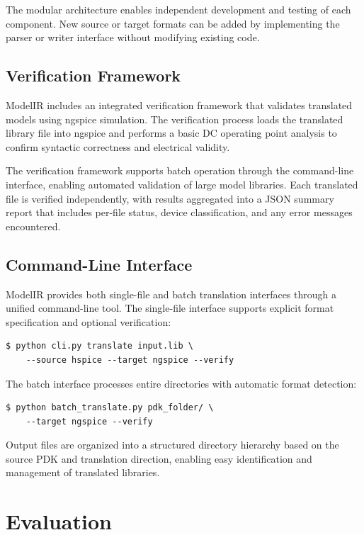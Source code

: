 \documentclass[conference]{IEEEtran}
\begin{document}
The modular architecture enables independent development and testing of each component. New source or target formats can be added by implementing the parser or writer interface without modifying existing code.

\subsection{Verification Framework}

ModelIR includes an integrated verification framework that validates translated models using ngspice simulation. The verification process loads the translated library file into ngspice and performs a basic DC operating point analysis to confirm syntactic correctness and electrical validity.

The verification framework supports batch operation through the command-line interface, enabling automated validation of large model libraries. Each translated file is verified independently, with results aggregated into a JSON summary report that includes per-file status, device classification, and any error messages encountered.

\subsection{Command-Line Interface}

ModelIR provides both single-file and batch translation interfaces through a unified command-line tool. The single-file interface supports explicit format specification and optional verification:

\begin{verbatim}
$ python cli.py translate input.lib \
    --source hspice --target ngspice --verify
\end{verbatim}

The batch interface processes entire directories with automatic format detection:

\begin{verbatim}
$ python batch_translate.py pdk_folder/ \
    --target ngspice --verify
\end{verbatim}

Output files are organized into a structured directory hierarchy based on the source PDK and translation direction, enabling easy identification and management of translated libraries.

\section{Evaluation}
\end{document}
